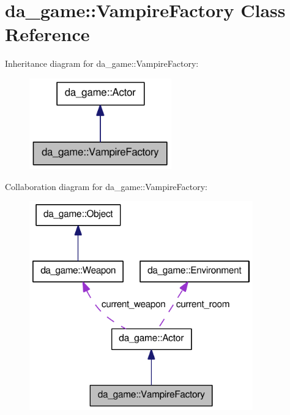\hypertarget{classda__game_1_1VampireFactory}{
\section{da\_\-game::VampireFactory Class Reference}
\label{classda__game_1_1VampireFactory}
}
Inheritance diagram for da\_\-game::VampireFactory:\nopagebreak
\begin{figure}[H]
\begin{center}
\leavevmode
\includegraphics[width=174pt]{classda__game_1_1VampireFactory__inherit__graph}
\end{center}
\end{figure}
Collaboration diagram for da\_\-game::VampireFactory:\nopagebreak
\begin{figure}[H]
\begin{center}
\leavevmode
\includegraphics[width=274pt]{classda__game_1_1VampireFactory__coll__graph}
\end{center}
\end{figure}
